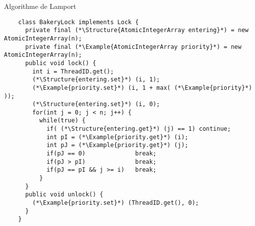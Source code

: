 
\begingroup

\begin{frame}[fragile]{Algorithme de Lamport}

  \begin{lstlisting}
    class BakeryLock implements Lock {
      private final (*\Structure{AtomicIntegerArray entering}*) = new AtomicIntegerArray(n);
      private final (*\Example{AtomicIntegerArray priority}*) = new AtomicIntegerArray(n);
      public void lock() {
        int i = ThreadID.get();
        (*\Structure{entering.set}*) (i, 1);
        (*\Example{priority.set}*) (i, 1 + max( (*\Example{priority}*) ));
        (*\Structure{entering.set}*) (i, 0);
        for(int j = 0; j < n; j++) {
          while(true) {
            if( (*\Structure{entering.get}*) (j) == 1) continue;
            int pI = (*\Example{priority.get}*) (i);
            int pJ = (*\Example{priority.get}*) (j);
            if(pJ == 0)              break;
            if(pJ > pI)              break;
            if(pJ == pI && j >= i)   break;
          }
      }
      public void unlock() {
        (*\Example{priority.set}*) (ThreadID.get(), 0);
      }
    }
  \end{lstlisting}


\end{frame}

\endgroup
\endinput
